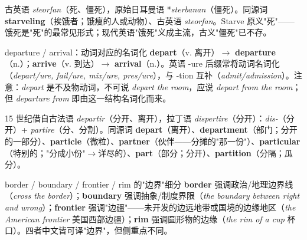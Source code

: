 \documentclass[../main.tex]{subfiles}
\begin{document}
\begin{origin}
古英语 \textit{steorfan}（死、僵死），原始日耳曼语 *\textit{sterbanan}（僵死）。同源词 \textbf{starveling}（挨饿者；饿瘦的人或动物）、古英语 \textit{steorfan}。Starve 原义"死"——饿死是"死"的最常见形式；现代英语"饿死"义成主流，古义"僵死"已不存。
\end{origin}



\begin{gram}{departure / arrival：动词对应的名词化}
\textbf{depart}（v. 离开）$\to$ \textbf{departure}（n.）；\textbf{arrive}（v. 到达）$\to$ \textbf{arrival}（n.）。英语 -ure 后缀常将动词名词化（\textit{depart/ure, fail/ure, mix/ure, pres/ure}），与 -tion 互补（\textit{admit/admission}）。注意：\textit{depart} 是不及物动词，不可说 \textit{depart the room}，应说 \textit{depart from the room}；但 \textit{departure from} 即由这一结构名词化而来。
\end{gram}

\begin{origin}
15 世纪借自古法语 \textit{departir}（分开、离开），拉丁语 \textit{dispertire}（分开）：\textit{dis-}（分开）+ \textit{partire}（分、分割）。同源词 \textbf{depart}（离开）、\textbf{department}（部门；分开的一部分）、\textbf{particle}（微粒）、\textbf{partner}（伙伴——分摊的"那一份"）、\textbf{particular}（特别的；"分成小份"$\to$详尽的）、\textbf{part}（部分；分开）、\textbf{partition}（分隔；瓜分）。
\end{origin}




\begin{gram}{border / boundary / frontier / rim 的"边界"细分}
\textbf{border} 强调政治/地理边界线（\textit{cross the border}）；\textbf{boundary} 强调抽象/制度界限（\textit{the boundary between right and wrong}）；\textbf{frontier} 强调"边疆"——未开发的边远地带或国境的边缘地区（\textit{the American frontier} 美国西部边疆）；\textbf{rim} 强调圆形物的边缘（\textit{the rim of a cup} 杯口）。四者中文皆可译"边界"，但侧重点不同。
\end{gram}
\end{document}
